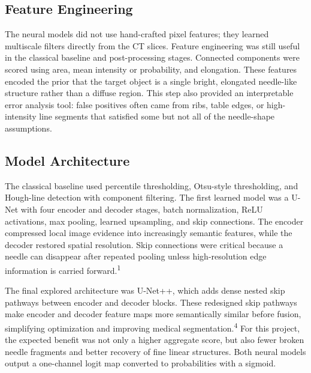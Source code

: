 \documentclass[10pt]{article}
\begin{document}
\subsection{Feature Engineering}
The neural models did not use hand-crafted pixel features; they learned multiscale filters directly from the CT slices. Feature engineering was still useful in the classical baseline and post-processing stages. Connected components were scored using area, mean intensity or probability, and elongation. These features encoded the prior that the target object is a single bright, elongated needle-like structure rather than a diffuse region. This step also provided an interpretable error analysis tool: false positives often came from ribs, table edges, or high-intensity line segments that satisfied some but not all of the needle-shape assumptions.

\subsection{Model Architecture}
The classical baseline used percentile thresholding, Otsu-style thresholding, and Hough-line detection with component filtering. The first learned model was a U-Net with four encoder and decoder stages, batch normalization, ReLU activations, max pooling, learned upsampling, and skip connections. The encoder compressed local image evidence into increasingly semantic features, while the decoder restored spatial resolution. Skip connections were critical because a needle can disappear after repeated pooling unless high-resolution edge information is carried forward.\textsuperscript{1}

The final explored architecture was U-Net++, which adds dense nested skip pathways between encoder and decoder blocks. These redesigned skip pathways make encoder and decoder feature maps more semantically similar before fusion, simplifying optimization and improving medical segmentation.\textsuperscript{4} For this project, the expected benefit was not only a higher aggregate score, but also fewer broken needle fragments and better recovery of fine linear structures. Both neural models output a one-channel logit map converted to probabilities with a sigmoid.
\end{document}
